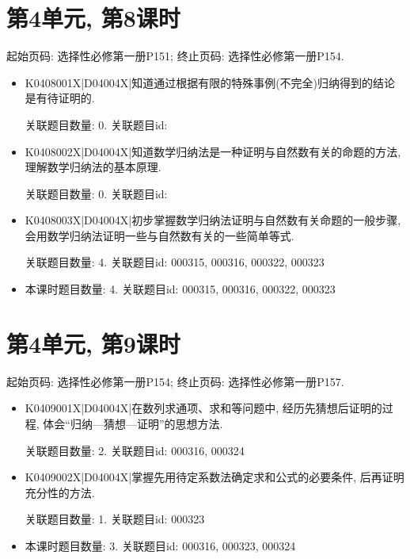 \section*{第4单元, 第8课时}
起始页码: 选择性必修第一册P151; 终止页码: 选择性必修第一册P154.
\begin{itemize}
\item K0408001X|D04004X|知道通过根据有限的特殊事例(不完全)归纳得到的结论是有待证明的.

关联题目数量: 0. 关联题目id: 

\item K0408002X|D04004X|知道数学归纳法是一种证明与自然数有关的命题的方法, 理解数学归纳法的基本原理.

关联题目数量: 0. 关联题目id: 

\item K0408003X|D04004X|初步掌握数学归纳法证明与自然数有关命题的一般步骤, 会用数学归纳法证明一些与自然数有关的一些简单等式.

关联题目数量: 4. 关联题目id: 000315, 000316, 000322, 000323

\item 本课时题目数量: 4. 关联题目id: 000315, 000316, 000322, 000323

\end{itemize}

\section*{第4单元, 第9课时}
起始页码: 选择性必修第一册P154; 终止页码: 选择性必修第一册P157.
\begin{itemize}
\item K0409001X|D04004X|在数列求通项、求和等问题中, 经历先猜想后证明的过程, 体会``归纳—猜想—证明''的思想方法.

关联题目数量: 2. 关联题目id: 000316, 000324

\item K0409002X|D04004X|掌握先用待定系数法确定求和公式的必要条件, 后再证明充分性的方法.

关联题目数量: 1. 关联题目id: 000323

\item 本课时题目数量: 3. 关联题目id: 000316, 000323, 000324

\end{itemize}

